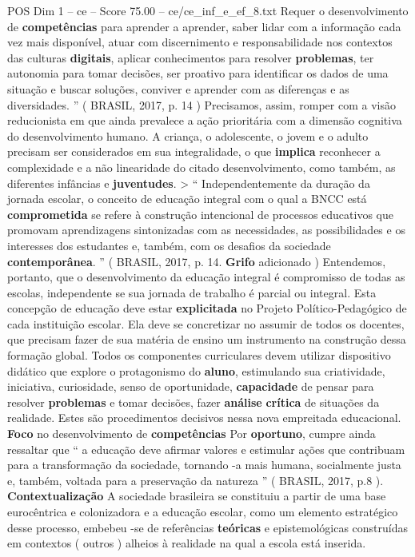 \begin{textsample}{POS Dim 1 – ce – Score 75.00 – ce/ce\_inf\_e\_ef\_8.txt}
Requer o desenvolvimento de \textbf{competências} para aprender a aprender, saber lidar com a informação cada vez mais disponível, atuar com discernimento e responsabilidade nos contextos das culturas \textbf{digitais}, aplicar conhecimentos para resolver \textbf{problemas}, ter autonomia para tomar decisões, ser proativo para identificar os dados de uma situação e buscar soluções, conviver e aprender com as diferenças e as diversidades. ” ( BRASIL, 2017, p. 14 ) Precisamos, assim, romper com a visão reducionista em que ainda prevalece a ação prioritária com a dimensão cognitiva do desenvolvimento humano.
A criança, o adolescente, o jovem e o adulto precisam ser considerados em sua integralidade, o que \textbf{implica} reconhecer a complexidade e a não linearidade do citado desenvolvimento, como também, as diferentes infâncias e \textbf{juventudes}. > “ Independentemente da duração da jornada escolar, o conceito de educação integral com o qual a BNCC está \textbf{comprometida} se refere à construção intencional de processos educativos que promovam aprendizagens sintonizadas com as necessidades, as possibilidades e os interesses dos estudantes e, também, com os desafios da sociedade \textbf{contemporânea}. ” ( BRASIL, 2017, p. 14. \textbf{Grifo} adicionado ) Entendemos, portanto, que o desenvolvimento da educação integral é compromisso de todas as escolas, independente se sua jornada de trabalho é parcial ou integral.
Esta concepção de educação deve estar \textbf{explicitada} no Projeto Político-Pedagógico de cada instituição escolar.
Ela deve se concretizar no assumir de todos os docentes, que precisam fazer de sua matéria de ensino um instrumento na construção dessa formação global.
Todos os componentes curriculares devem utilizar dispositivo didático que explore o protagonismo do \textbf{aluno}, estimulando sua criatividade, iniciativa, curiosidade, senso de oportunidade, \textbf{capacidade} de pensar para resolver \textbf{problemas} e tomar decisões, fazer \textbf{análise} \textbf{crítica} de situações da realidade.
Estes são procedimentos decisivos nessa nova empreitada educacional. \textbf{Foco} no desenvolvimento de \textbf{competências} Por \textbf{oportuno}, cumpre ainda ressaltar que “ a educação deve afirmar valores e estimular ações que contribuam para a transformação da sociedade, tornando -a mais humana, socialmente justa e, também, voltada para a preservação da natureza ” ( BRASIL, 2017, p.8 ). \textbf{Contextualização} A sociedade brasileira se constituiu a partir de uma base eurocêntrica e colonizadora e a educação escolar, como um elemento estratégico desse processo, embebeu -se de referências \textbf{teóricas} e epistemológicas construídas em contextos ( outros ) alheios à realidade na qual a escola está inserida.

\end{textsample}
